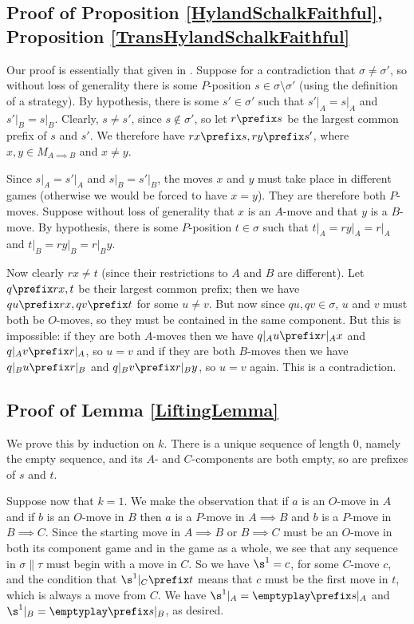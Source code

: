 \documentclass[11pt]{article} %
\begin{document}
\subsection{Proof of Proposition \ref{HylandSchalkFaithful}, Proposition \ref{TransHylandSchalkFaithful}}
\label{HylandSchalkFaithfulProof}

Our proof is essentially that given in \cite{CalderonMcCusker}.  Suppose for a contradiction that $\sigma\ne\sigma'$, so without loss of generality there is some $P$-position $s\in\sigma\setminus\sigma'$ (using the definition of a strategy).  By hypothesis, there is some $s'\in\sigma'$ such that $s'\vert_A=s\vert_A$ and $s'\vert_B=s\vert_B$.  Clearly, $s\ne s'$, since $s\not\in\sigma'$, so let $r\prefix s$ be the largest common prefix of $s$ and $s'$.  We therefore have $rx\prefix s,ry\prefix s'$, where $x,y\in M_{A\implies B}$ and $x\ne y$.  

Since $s\vert_A=s'\vert_A$ and $s\vert_B=s'\vert_B$, the moves $x$ and $y$ must take place in different games (otherwise we would be forced to have $x=y$).  They are therefore both $P$-moves.  Suppose without loss of generality that $x$ is an $A$-move and that $y$ is a $B$-move.  By hypothesis, there is some $P$-position $t\in\sigma$ such that $t\vert_A=ry\vert_A=r\vert_A$ and $t\vert_B=ry\vert_B=r\vert_By$.

Now clearly $rx\ne t$ (since their restrictions to $A$ and $B$ are different).  Let $q\prefix rx, t$ be their largest common prefix; then we have $qu\prefix rx, qv\prefix t$ for some $u\ne v$.  But now since $qu, qv\in\sigma$, $u$ and $v$ must both be $O$-moves, so they must be contained in the same component.  But this is impossible: if they are both $A$-moves then we have $q\vert_Au\prefix r\vert_A x$ and $q\vert_Av\prefix r\vert_A$, so $u=v$ and if they are both $B$-moves then we have $q\vert_Bu\prefix r\vert_B$ and $q\vert_Bv\prefix r\vert_By$, so $u=v$ again.  This is a contradiction.

\subsection{Proof of Lemma \ref{LiftingLemma}}
\label{LiftingLemmaProof}

We prove this by induction on $k$.  There is a unique sequence of length $0$, namely the empty sequence, and its $A$- and $C$-components are both empty, so are prefixes of $s$ and $t$.  

Suppose now that $k=1$.  We make the observation that if $a$ is an $O$-move in $A$ and if $b$ is an $O$-move in $B$ then $a$ is a $P$-move in $A\implies B$ and $b$ is a $P$-move in $B\implies C$.  Since the starting move in $A\implies B$ or $B\implies C$ must be an $O$-move in both its component game and in the game as a whole, we see that any sequence in $\sigma\|\tau$ must begin with a move in $C$.  So we have $\s^1=c$, for some $C$-move $c$, and the condition that $\s^1\vert_C\prefix t$ means that $c$ must be the first move in $t$, which is always a move from $C$.  We have $\s^1\vert_A=\emptyplay\prefix s\vert_A$ and $\s^1\vert_B=\emptyplay\prefix s\vert_B$, as desired.
\end{document}
